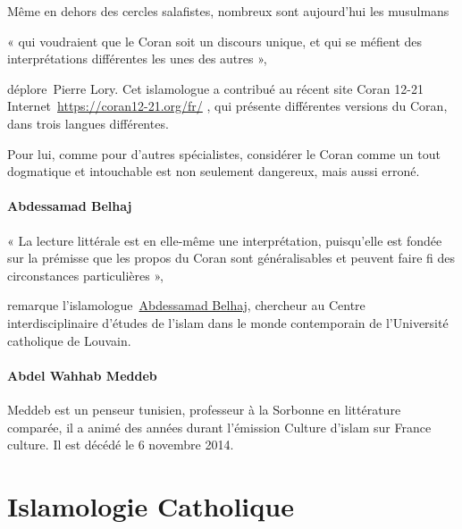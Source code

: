 Même en dehors des cercles salafistes, nombreux sont aujourd'hui les
musulmans~

\begin{cite}
« qui voudraient que le Coran soit un discours unique,
et qui se méfient des interprétations différentes les unes des autres
»,~
\end{cite}
\emph{}déplore~{{Pierre
Lory}}. Cet islamologue a contribué au récent site {{Coran 12-21}}
Internet~\url{https://coran12-21.org/fr/} , qui
présente différentes versions du Coran, dans trois langues différentes.

Pour lui, comme pour d'autres spécialistes, considérer le Coran comme un
tout dogmatique et intouchable est non seulement dangereux, mais aussi
erroné.

\paragraph{Abdessamad
Belhaj}
\begin{cite}
« La lecture littérale est en elle-même une
interprétation, puisqu'elle est fondée sur la prémisse que les propos du
Coran sont généralisables et peuvent faire fi des circonstances
particulières »,~
\end{cite}
remarque
l'islamologue~{\underline{Abdessamad
Belhaj}}, chercheur au Centre interdisciplinaire d'études de l'islam
dans le monde contemporain de l'Université catholique de Louvain.

\paragraph{Abdel Wahhab Meddeb}
{Meddeb est
    un penseur tunisien}, professeur à la Sorbonne en littérature
    comparée, il a animé des années durant l'émission Culture d'islam
    sur France culture. Il est décédé le 6 novembre 2014.






\section{Islamologie Catholique}


